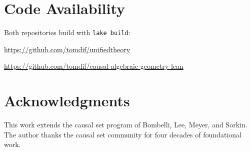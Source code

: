 \documentclass[11pt,letterpaper]{article}
\theoremstyle{remark}
\begin{document}
\section*{Code Availability}

Both repositories build with \texttt{lake build}:

\noindent \url{https://github.com/tomdif/unifiedtheory}

\noindent \url{https://github.com/tomdif/causal-algebraic-geometry-lean}

\section*{Acknowledgments}

This work extends the causal set program of Bombelli, Lee, Meyer,
and Sorkin. The author thanks the causal set community for four
decades of foundational work.
\end{document}
